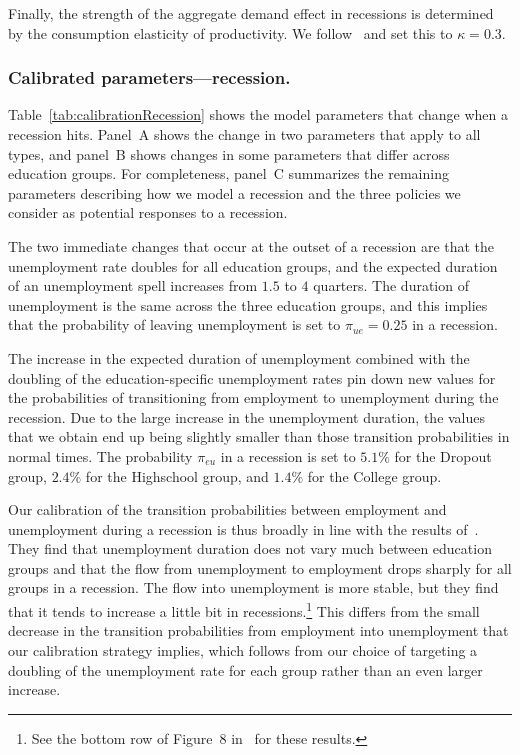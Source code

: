 \documentclass[qe,draft]{econsocart}
\theoremstyle{plain}
\theoremstyle{definition}
\begin{document}
Finally, the strength of the aggregate demand effect in recessions is determined by the consumption elasticity of productivity.
We follow~\cite{kmpHandbook} and set this to $\kappa=0.3$.

\subsubsection{Calibrated parameters---recession.}
\label{sec:calibRecession}

Table~\ref{tab:calibrationRecession} shows the model parameters that change when a recession hits. Panel~A shows the change in two parameters that apply to all types, and panel~B shows changes in some parameters that differ across education groups. For completeness, panel~C summarizes the remaining parameters describing how we model a recession and the three policies we consider as potential responses to a recession.

The two immediate changes that occur at the outset of a recession are that the unemployment rate doubles for all education groups, and the expected duration of an unemployment spell increases from $1.5$ to $4$ quarters. The duration of unemployment is the same across the three education groups, and this implies that the probability of leaving unemployment is set to $\pi_{ue} = 0.25$ in a recession.

The increase in the expected duration of unemployment combined with the doubling of the education-specific unemployment rates pin down new values for the probabilities of transitioning from employment to unemployment during the recession. Due to the large increase in the unemployment duration, the values that we obtain end up being slightly smaller than those transition probabilities in normal times. The probability $\pi_{eu}$ in a recession is set to $5.1\%$ for the Dropout group, $2.4\%$ for the Highschool group, and $1.4\%$ for the College group.

Our calibration of the transition probabilities between employment and unemployment during a recession is thus broadly in line with the results of~\cite{elsby2010labor}. They find that unemployment duration does not vary much between education groups and that the flow from unemployment to employment drops sharply for all groups in a recession. The flow into unemployment is more stable, but they find that it tends to increase a little bit in recessions.\footnote{See the bottom row of Figure~8 in~\cite{elsby2010labor} for these results.} This differs from the small decrease in the transition probabilities from employment into unemployment that our calibration strategy implies, which follows from our choice of targeting a doubling of the unemployment rate for each group rather than an even larger increase.
\end{document}
